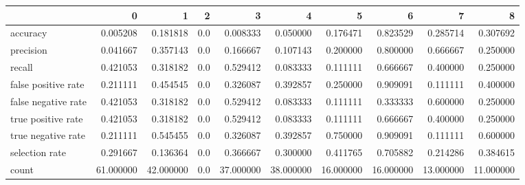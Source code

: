 \begin{tabular}{lrrrrrrrrr}
\toprule
{} &          0 &          1 &    2 &          3 &          4 &          5 &          6 &          7 &          8 \\
\midrule
accuracy            &   0.005208 &   0.181818 &  0.0 &   0.008333 &   0.050000 &   0.176471 &   0.823529 &   0.285714 &   0.307692 \\
precision           &   0.041667 &   0.357143 &  0.0 &   0.166667 &   0.107143 &   0.200000 &   0.800000 &   0.666667 &   0.250000 \\
recall              &   0.421053 &   0.318182 &  0.0 &   0.529412 &   0.083333 &   0.111111 &   0.666667 &   0.400000 &   0.250000 \\
false positive rate &   0.211111 &   0.454545 &  0.0 &   0.326087 &   0.392857 &   0.250000 &   0.909091 &   0.111111 &   0.400000 \\
false negative rate &   0.421053 &   0.318182 &  0.0 &   0.529412 &   0.083333 &   0.111111 &   0.333333 &   0.600000 &   0.250000 \\
true positive rate  &   0.421053 &   0.318182 &  0.0 &   0.529412 &   0.083333 &   0.111111 &   0.666667 &   0.400000 &   0.250000 \\
true negative rate  &   0.211111 &   0.545455 &  0.0 &   0.326087 &   0.392857 &   0.750000 &   0.909091 &   0.111111 &   0.600000 \\
selection rate      &   0.291667 &   0.136364 &  0.0 &   0.366667 &   0.300000 &   0.411765 &   0.705882 &   0.214286 &   0.384615 \\
count               &  61.000000 &  42.000000 &  0.0 &  37.000000 &  38.000000 &  16.000000 &  16.000000 &  13.000000 &  11.000000 \\
\bottomrule
\end{tabular}
